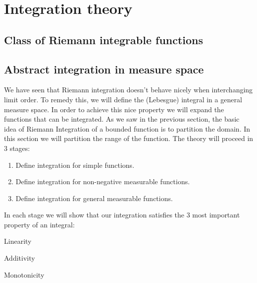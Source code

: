 \chapter{Integration theory}
\section{Class of Riemann integrable functions}
\section{Abstract integration in measure space}
We have seen that Riemann integration doesn't behave nicely when interchanging limit order. To remedy this, we
will define the (Lebesgue) integral in a general measure space. In order to achieve this nice property we will
expand the functions that can be integrated. As we saw in the previous section, the basic idea of Riemann
Integration of a bounded function is to partition the domain. In this section we will partition the range of
the function. The theory will proceed in $3$ stages:
\begin{enumerate}
    \item
	Define integration for simple functions.
    \item
	Define integration for non-negative measurable functions.
    \item
	Define integration for general measurable functions.
\end{enumerate}
In each stage we will show that our integration satisfies the $3$ most important property of an integral:
\begin{properties}
\item
    Linearity
\item
    Additivity
\item
    Monotonicity
\end{properties}

